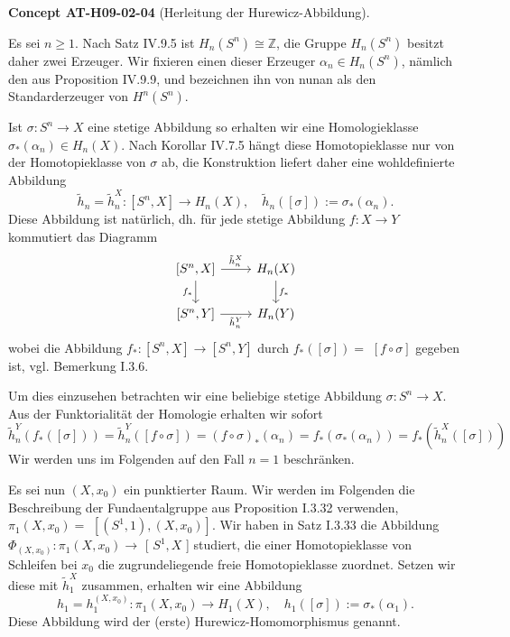 \documentclass[10pt, letterpaper]{article}
\newcommand{\CustomHeading}[3]{%
  \par\medskip\noindent%
  \textbf{#1 #2} \textnormal{(#3)}.\enskip%
}
\newenvironment{CONC}[2]{\CustomHeading{Concept}{#1}{#2}}{}
\begin{document}
\begin{CONC}{AT-H09-02-04}{Herleitung der Hurewicz-Abbildung}
Es sei $n \geq 1$. Nach Satz IV.9.5 ist $H_n\left(S^n\right) \cong \mathbb{Z}$, die Gruppe $H_n\left(S^n\right)$ besitzt daher zwei Erzeuger. Wir fixieren einen dieser Erzeuger $\alpha_n \in H_n\left(S^n\right)$, nämlich den aus Proposition IV.9.9, und bezeichnen ihn von nunan als den Standarderzeuger von $H^n\left(S^n\right)$.

Ist $\sigma: S^n \rightarrow X$ eine stetige Abbildung so erhalten wir eine Homologieklasse $\sigma_*\left(\alpha_n\right) \in H_n(X)$. Nach Korollar IV.7.5 hängt diese Homotopieklasse nur von der Homotopieklasse von $\sigma$ ab, die Konstruktion liefert daher eine wohldefinierte Abbildung
$$
\tilde{h}_n=\tilde{h}_n^X:\left[S^n, X\right] \rightarrow H_n(X), \quad \tilde{h}_n([\sigma]):=\sigma_*\left(\alpha_n\right) .
$$
Diese Abbildung ist natürlich, dh. für jede stetige Abbildung $f: X \rightarrow Y$ kommutiert das Diagramm
\[
\begin{tikzcd}
{[S^n, X]} \arrow[r, "\tilde{h}_n^X"] \arrow[d, "f_*"'] & H_n(X) \arrow[d, "f_*"] \\
{[S^n, Y]} \arrow[r, "\tilde{h}_n^Y"'] & H_n(Y)
\end{tikzcd}
\]
wobei die Abbildung $f_*:\left[S^n, X\right] \rightarrow\left[S^n, Y\right]$ durch $f_*([\sigma])=$ $[f \circ \sigma]$ gegeben ist, vgl. Bemerkung I.3.6. 

Um dies einzusehen betrachten wir eine beliebige stetige Abbildung $\sigma: S^n \rightarrow X$. Aus der Funktorialität der Homologie erhalten wir sofort 
$$\tilde{h}_n^Y\left(f_*([\sigma])\right)=\tilde{h}_n^Y([f \circ \sigma])=(f \circ \sigma)_*\left(\alpha_n\right)=f_*\left(\sigma_*\left(\alpha_n\right)\right)=f_*\left(\tilde{h}_n^X([\sigma])\right)$$ 
Wir werden uns im Folgenden auf den Fall $n=1$ beschränken.

Es sei nun $(X, x_0)$ ein punktierter Raum. Wir werden im Folgenden die Beschreibung der Fundaentalgruppe aus Proposition I.3.32 verwenden, $\pi_1\left(X, x_0\right)=$ $\left[\left(S^1, 1\right),\left(X, x_0\right)\right]$. Wir haben in Satz I.3.33 die Abbildung $\Phi_{\left(X, x_0\right)}: \pi_1\left(X, x_0\right) \rightarrow$ [ $S^1, X$ ] studiert, die einer Homotopieklasse von Schleifen bei $x_0$ die zugrundeliegende freie Homotopieklasse zuordnet. Setzen wir diese mit $\tilde{h}_1^X$ zusammen, erhalten wir eine Abbildung
$$
h_1=h_1^{\left(X, x_0\right)}: \pi_1\left(X, x_0\right) \rightarrow H_1(X), \quad h_1([\sigma]):=\sigma_*\left(\alpha_1\right) .
$$
Diese Abbildung wird der (erste) Hurewicz-Homomorphismus genannt.
\end{CONC}
\end{document}
